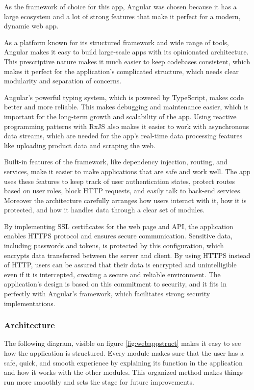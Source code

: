 As the framework of choice for this app, Angular was chosen because it has a large ecosystem and a lot of strong features that make it perfect for a modern, dynamic web app.

As a platform known for its structured framework and wide range of tools, Angular makes it easy to build large-scale apps with its opinionated architecture. This prescriptive nature makes it much easier to keep codebases consistent, which makes it perfect for the application's complicated structure, which needs clear modularity and separation of concerns.

Angular's powerful typing system, which is powered by TypeScript, makes code better and more reliable. This makes debugging and maintenance easier, which is important for the long-term growth and scalability of the app. Using reactive programming patterns with RxJS also makes it easier to work with asynchronous data streams, which are needed for the app's real-time data processing features like uploading product data and scraping the web.

Built-in features of the framework, like dependency injection, routing, and services, make it easier to make applications that are safe and work well. The app uses these features to keep track of user authentication states, protect routes based on user roles, block HTTP requests, and easily talk to back-end services. Moreover the architecture carefully arranges how users interact with it, how it is protected, and how it handles data through a clear set of modules.

By implementing SSL certificates for the web page and API, the application enables HTTPS protocol and ensures secure communication. Sensitive data, including passwords and tokens, is protected by this configuration, which encrypts data transferred between the server and client. By using HTTPS instead of HTTP, users can be assured that their data is encrypted and unintelligible even if it is intercepted, creating a secure and reliable environment. The application's design is based on this commitment to security, and it fits in perfectly with Angular's framework, which facilitates strong security implementations.

\newpage

\subsubsection{Architecture}

The following diagram, visible on figure \ref{fig:webappstruct} makes it easy to see how the application is structured. Every module makes sure that the user has a safe, quick, and smooth experience by explaining its function in the application and how it works with the other modules. This organized method makes things run more smoothly and sets the stage for future improvements.

